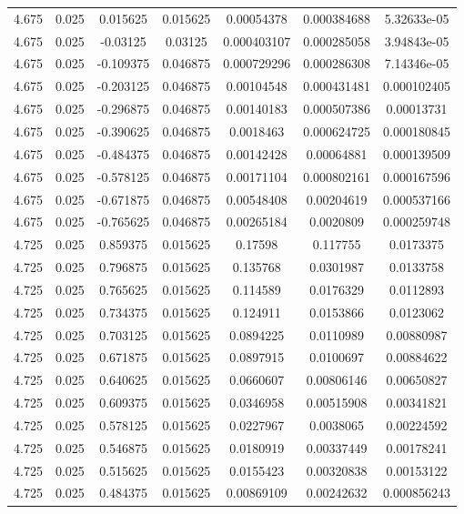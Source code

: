 \begin{flushleft}
\begin{longtable}{ccccccc}
4.675 & 0.025 & 0.015625 & 0.015625 & 0.00054378 & 0.000384688 & 5.32633e-05  \\ 
4.675 & 0.025 & -0.03125 & 0.03125 & 0.000403107 & 0.000285058 & 3.94843e-05  \\ 
4.675 & 0.025 & -0.109375 & 0.046875 & 0.000729296 & 0.000286308 & 7.14346e-05  \\ 
4.675 & 0.025 & -0.203125 & 0.046875 & 0.00104548 & 0.000431481 & 0.000102405  \\ 
4.675 & 0.025 & -0.296875 & 0.046875 & 0.00140183 & 0.000507386 & 0.00013731  \\ 
4.675 & 0.025 & -0.390625 & 0.046875 & 0.0018463 & 0.000624725 & 0.000180845  \\ 
4.675 & 0.025 & -0.484375 & 0.046875 & 0.00142428 & 0.00064881 & 0.000139509  \\ 
4.675 & 0.025 & -0.578125 & 0.046875 & 0.00171104 & 0.000802161 & 0.000167596  \\ 
4.675 & 0.025 & -0.671875 & 0.046875 & 0.00548408 & 0.00204619 & 0.000537166  \\ 
4.675 & 0.025 & -0.765625 & 0.046875 & 0.00265184 & 0.0020809 & 0.000259748  \\ 
4.725 & 0.025 & 0.859375 & 0.015625 & 0.17598 & 0.117755 & 0.0173375  \\ 
4.725 & 0.025 & 0.796875 & 0.015625 & 0.135768 & 0.0301987 & 0.0133758  \\ 
4.725 & 0.025 & 0.765625 & 0.015625 & 0.114589 & 0.0176329 & 0.0112893  \\ 
4.725 & 0.025 & 0.734375 & 0.015625 & 0.124911 & 0.0153866 & 0.0123062  \\ 
4.725 & 0.025 & 0.703125 & 0.015625 & 0.0894225 & 0.0110989 & 0.00880987  \\ 
4.725 & 0.025 & 0.671875 & 0.015625 & 0.0897915 & 0.0100697 & 0.00884622  \\ 
4.725 & 0.025 & 0.640625 & 0.015625 & 0.0660607 & 0.00806146 & 0.00650827  \\ 
4.725 & 0.025 & 0.609375 & 0.015625 & 0.0346958 & 0.00515908 & 0.00341821  \\ 
4.725 & 0.025 & 0.578125 & 0.015625 & 0.0227967 & 0.0038065 & 0.00224592  \\ 
4.725 & 0.025 & 0.546875 & 0.015625 & 0.0180919 & 0.00337449 & 0.00178241  \\ 
4.725 & 0.025 & 0.515625 & 0.015625 & 0.0155423 & 0.00320838 & 0.00153122  \\ 
4.725 & 0.025 & 0.484375 & 0.015625 & 0.00869109 & 0.00242632 & 0.000856243  \\ 

\end{longtable}
\end{flushleft}
